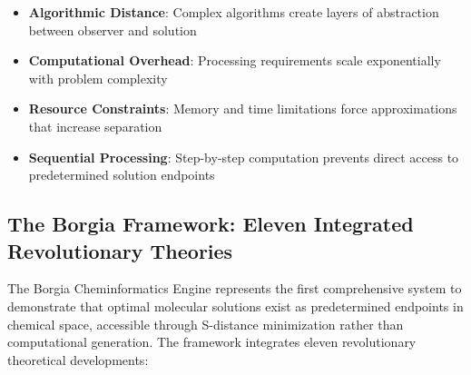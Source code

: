 ﻿\documentclass[11pt,a4paper]{article}
\begin{document}
\begin{itemize}
\item \textbf{Algorithmic Distance}: Complex algorithms create layers of abstraction between observer and solution
\item \textbf{Computational Overhead}: Processing requirements scale exponentially with problem complexity
\item \textbf{Resource Constraints}: Memory and time limitations force approximations that increase separation
\item \textbf{Sequential Processing}: Step-by-step computation prevents direct access to predetermined solution endpoints
\end{itemize}

\subsection{The Borgia Framework: Eleven Integrated Revolutionary Theories}

The Borgia Cheminformatics Engine represents the first comprehensive system to demonstrate that optimal molecular solutions exist as predetermined endpoints in chemical space, accessible through S-distance minimization rather than computational generation. The framework integrates eleven revolutionary theoretical developments:
\end{document}

